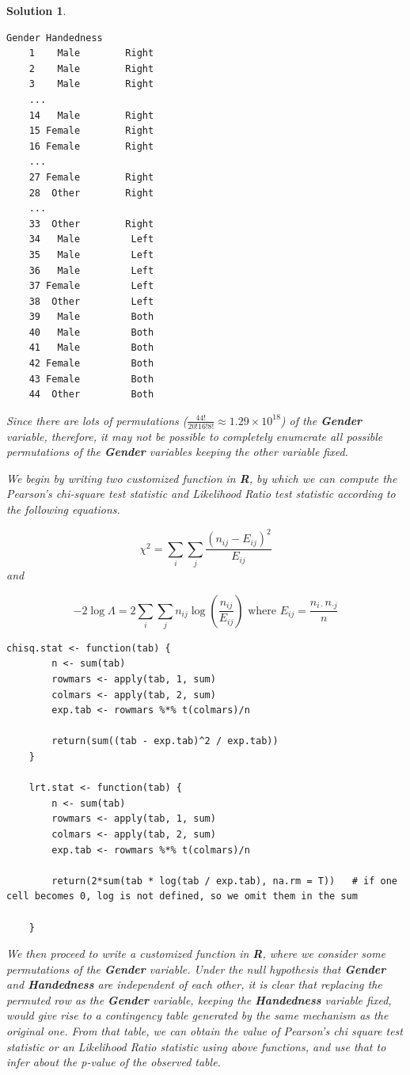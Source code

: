 \documentclass[12pt]{article}
\theoremstyle{problemstyle}
\newtheorem*{solution*}{Solution}
\begin{document}
\begin{solution*}
\begin{lstlisting}[style = R-output]
	   Gender Handedness
	1    Male        Right
	2    Male        Right
	3    Male        Right
	...
	14   Male        Right
	15 Female        Right
	16 Female        Right
	...
	27 Female        Right
	28  Other        Right
	...
	33  Other        Right
	34   Male         Left
	35   Male         Left
	36   Male         Left
	37 Female         Left
	38  Other         Left
	39   Male         Both
	40   Male         Both
	41   Male         Both
	42 Female         Both
	43 Female         Both
	44  Other         Both
\end{lstlisting}

Since there are lots of permutations ($\frac{44!}{20!16!8!} \approx 1.29 \times 10^{18}$) of the \textbf{Gender} variable, therefore, it may not be possible to completely enumerate all possible permutations of the \textbf{Gender} variables keeping the other variable fixed.

We begin by writing two customized function in \textbf{R}, by which we can compute the Pearson's chi-square test statistic and Likelihood Ratio test statistic according to the following equations.

\begin{equation*}
\chi^2 = \sum_{i}\sum_{j} \frac{(n_{ij} - E_{ij})^2}{E_{ij}}
\end{equation*}
and

\begin{equation*}
-2\log\Lambda = 2\sum_i \sum_j n_{ij} \log\left( \frac{n_{ij}}{E_{ij}} \right) \text{ where } E_{ij} = \frac{n_{i\cdot}n_{\cdot j}}{n}
\end{equation*}


\begin{lstlisting}[style = R-code]
	chisq.stat <- function(tab) {
		n <- sum(tab)
		rowmars <- apply(tab, 1, sum)
		colmars <- apply(tab, 2, sum)
		exp.tab <- rowmars %*% t(colmars)/n
	
		return(sum((tab - exp.tab)^2 / exp.tab))
	}
	
	lrt.stat <- function(tab) {
		n <- sum(tab)
		rowmars <- apply(tab, 1, sum)
		colmars <- apply(tab, 2, sum)
		exp.tab <- rowmars %*% t(colmars)/n
		
		return(2*sum(tab * log(tab / exp.tab), na.rm = T))   # if one cell becomes 0, log is not defined, so we omit them in the sum
	
	}
\end{lstlisting}


We then proceed to write a customized function in \textbf{R}, where we consider some permutations of the \textbf{Gender} variable. Under the null hypothesis that \textbf{Gender} and \textbf{Handedness} are independent of each other, it is clear that replacing the permuted row as the \textbf{Gender} variable, keeping the \textbf{Handedness} variable fixed, would give rise to a contingency table generated by the same mechanism as the original one. From that table, we can obtain the value of Pearson's chi square test statistic or an Likelihood Ratio statistic using above functions, and use that to infer about the p-value of the observed table.



\end{solution*}
\end{document}
